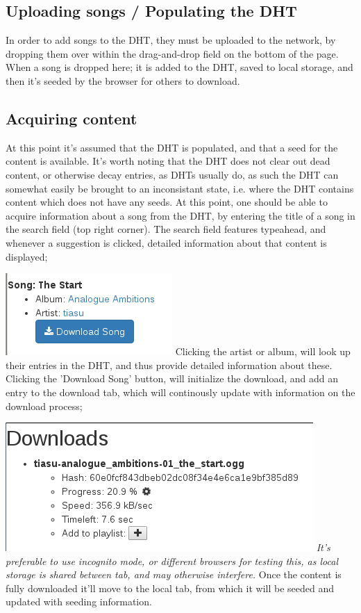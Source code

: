 \subsection{Uploading songs / Populating the \acs{DHT}}
In order to add songs to the \acs{DHT}, they must be uploaded to the network, by 
dropping them over within the drag-and-drop field on the bottom of the page.
When a song is dropped here; it is added to the \acs{DHT}, saved to local storage,
and then it's seeded by the browser for others to download.

\subsection{Acquiring content}
At this point it's assumed that the \acs{DHT} is populated, and that a seed for the
content is available. It's worth noting that the \acs{DHT} does not clear out dead
content, or otherwise decay entries, as \acs{DHT}s usually do, as such the \acs{DHT} can 
somewhat easily be brought to an inconsistant state, i.e. where the \acs{DHT}
contains content which does not have any seeds.
\newline\newline
At this point, one should be able to acquire information about a song from the
\acs{DHT}, by entering the title of a song in the search field (top right corner).
The search field features typeahead, and whenever a suggestion is clicked,
detailed information about that content is displayed;

\includegraphics{gfx/search-info}
\newline
Clicking the artist or album, will look up their entries in the \acs{DHT}, and thus
provide detailed information about these. Clicking the 'Download Song' button,
will initialize the download, and add an entry to the download tab, which will
continously update with information on the download process;

\includegraphics{gfx/download-info}
\newline
{\em It's preferable to use incognito mode, or different browsers for testing this,
as local storage is shared between tab, and may otherwise interfere.}
\newline\newline
Once the content is fully downloaded it'll move to the local tab, from which it
will be seeded and updated with seeding information. 

